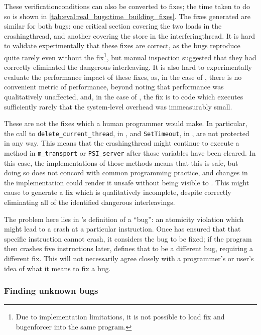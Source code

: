 \noindent
These \glspl{verificationcondition} can also be converted to fixes;
the time taken to do so is shown in
\autoref{tab:eval:real_bugs:time_building_fixes}.  The fixes generated
are similar for both bugs: one critical section covering the two loads
in the \gls{crashingthread}, and another covering the store in the
\gls{interferingthread}.  It is hard to validate experimentally that
these fixes are correct, as the bugs reproduce quite rarely even
without the fix\footnote{Due to implementation limitations, it is not
  possible to load {\atechnique} fix and {\atechnique}
  \gls{bugenforcer} into the same program.}\!\!, but manual inspection
suggested that they had correctly eliminated the dangerous
interleaving.  It is also hard to experimentally evaluate the
performance impact of these fixes, as, in the case of
, there is no convenient metric of performance,
beyond noting that performance was qualitatively unaffected, and, in
the case of , the fix is to code which executes
sufficiently rarely that the system-level overhead was immeasurably
small.

These are not the fixes which a human programmer would make.  In
particular, the call to \texttt{delete\_current\_thread}, in
, and \texttt{SetTimeout}, in ,
are not protected in any way.  This means that the
\gls{crashingthread} might continue to execute a method in
\texttt{m\_transport} or \texttt{PSI\_server} after those variables
have been cleared.  In this case, the implementations of those methods
means that this is safe, but doing so does not concord with common
programming practice, and changes in the implementation could render
it unsafe without being visible to {\technique}.  This might cause
{\technique} to generate a fix which is qualitatively incomplete,
despite correctly eliminating all of the identified dangerous
interleavings.

The problem here lies in {\technique}'s definition of a ``bug'': an
atomicity violation which might lead to a crash at a particular
instruction.  Once {\technique} has ensured that that specific
instruction cannot crash, it considers the bug to be fixed; if the
program then crashes five instructions later, {\technique} defines
that to be a different bug, requiring a different fix.  This will not
necessarily agree closely with a programmer's or user's idea of what
it means to fix a bug.

\subsubsection{Finding unknown bugs}
\label{sect:how:finding_unknown}

